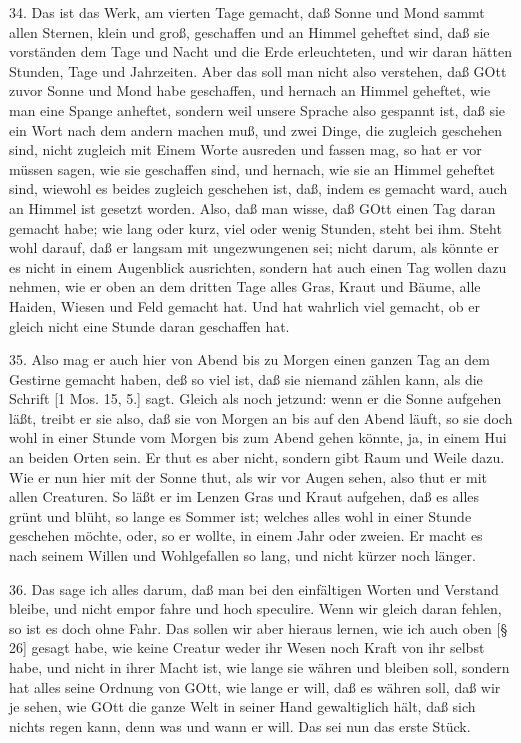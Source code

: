 34. Das ist das Werk, am vierten Tage gemacht, daß Sonne und Mond sammt allen Sternen, klein und groß, geschaffen und an Himmel geheftet sind, daß sie vorständen dem Tage und Nacht und die Erde erleuchteten, und wir daran hätten Stunden, Tage und Jahrzeiten. Aber das soll man nicht also verstehen, daß GOtt zuvor Sonne und Mond habe geschaffen, und hernach an Himmel geheftet, wie man eine Spange anheftet, sondern weil unsere Sprache also gespannt ist, daß sie ein Wort nach dem andern machen muß, und zwei Dinge, die zugleich geschehen sind, nicht zugleich mit Einem Worte ausreden und fassen mag, so hat er vor müssen sagen, wie sie geschaffen sind, und hernach, wie sie an Himmel geheftet sind, wiewohl es beides zugleich geschehen ist, daß, indem es gemacht ward, auch an Himmel ist gesetzt worden. Also, daß man wisse, daß GOtt einen Tag daran gemacht habe; wie lang oder kurz, viel oder wenig Stunden, steht bei ihm. Steht wohl darauf, daß er langsam mit ungezwungenen sei; nicht darum, als könnte er es nicht in einem Augenblick ausrichten, sondern hat auch einen Tag wollen dazu nehmen, wie er oben an dem dritten Tage alles Gras, Kraut und Bäume, alle Haiden, Wiesen und Feld gemacht hat. Und hat wahrlich viel gemacht, ob er gleich nicht eine Stunde daran geschaffen hat.

35. Also mag er auch hier von Abend bis zu Morgen einen ganzen Tag an dem Gestirne gemacht haben, deß so viel ist, daß sie niemand zählen kann, als die Schrift [1 Mos. 15, 5.] sagt. Gleich als noch jetzund: wenn er die Sonne aufgehen läßt, treibt er sie also, daß sie von Morgen an bis auf den Abend läuft, so sie doch wohl in einer Stunde vom Morgen bis zum Abend gehen könnte, ja, in einem Hui an beiden Orten sein. Er thut es aber nicht, sondern gibt Raum und Weile dazu. Wie er nun hier mit der Sonne thut, als wir vor Augen sehen, also thut er mit allen Creaturen. So läßt er im Lenzen Gras und Kraut aufgehen, daß es alles grünt und blüht, so lange es Sommer ist; welches alles wohl in einer Stunde geschehen möchte, oder, so er wollte, in einem Jahr oder zweien. Er macht es nach seinem Willen und Wohlgefallen so lang, und nicht kürzer noch länger.

36. Das sage ich alles darum, daß man bei den einfältigen Worten und Verstand bleibe, und nicht empor fahre und hoch speculire. Wenn wir gleich daran fehlen, so ist es doch ohne Fahr. Das sollen wir aber hieraus lernen, wie ich auch oben [§ 26] gesagt habe, wie keine Creatur weder ihr Wesen noch Kraft von ihr selbst habe, und nicht in ihrer Macht ist, wie lange sie währen und bleiben soll, sondern hat alles seine Ordnung von GOtt, wie lange er will, daß es währen soll, daß wir je sehen, wie GOtt die ganze Welt in seiner Hand gewaltiglich hält, daß sich nichts regen kann, denn was und wann er will. Das sei nun das erste Stück.

